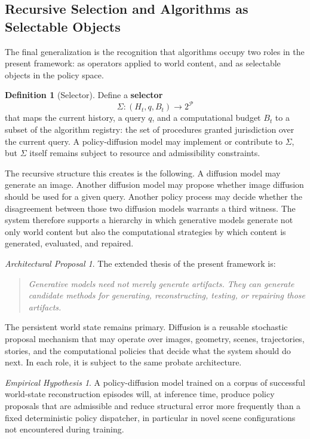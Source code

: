 \documentclass[12pt,a4paper]{article}
\theoremstyle{plain}
\theoremstyle{definition}
\newtheorem{definition}[theorem]{Definition}
\theoremstyle{remark}
\newtheorem{hypothesis}[theorem]{Empirical Hypothesis}
\newtheorem{proposal}[theorem]{Architectural Proposal}
\begin{document}
\subsection{Recursive Selection and Algorithms as Selectable Objects}

The final generalization is the recognition that algorithms occupy two roles in the present framework: as operators applied to world content, and as selectable objects in the policy space.

\begin{definition}[Selector]
Define a \textbf{selector}
\[
\Sigma : (H_t, q, B_t) \to 2^{\mathcal{P}}
\]
that maps the current history, a query $q$, and a computational budget $B_t$ to a subset of the algorithm registry: the set of procedures granted jurisdiction over the current query. A policy-diffusion model may implement or contribute to $\Sigma$, but $\Sigma$ itself remains subject to resource and admissibility constraints.
\end{definition}

The recursive structure this creates is the following. A diffusion model may generate an image. Another diffusion model may propose whether image diffusion should be used for a given query. Another policy process may decide whether the disagreement between those two diffusion models warrants a third witness. The system therefore supports a hierarchy in which generative models generate not only world content but also the computational strategies by which content is generated, evaluated, and repaired.

\begin{proposal}
\label{prop:recursive}
The extended thesis of the present framework is:
\begin{quote}
\itshape
Generative models need not merely generate artifacts. They can generate candidate methods for generating, reconstructing, testing, or repairing those artifacts.
\end{quote}
The persistent world state remains primary. Diffusion is a reusable stochastic proposal mechanism that may operate over images, geometry, scenes, trajectories, stories, and the computational policies that decide what the system should do next. In each role, it is subject to the same probate architecture.
\end{proposal}

\begin{hypothesis}
\label{hyp:policy-diffusion}
A policy-diffusion model trained on a corpus of successful world-state reconstruction episodes will, at inference time, produce policy proposals that are admissible and reduce structural error more frequently than a fixed deterministic policy dispatcher, in particular in novel scene configurations not encountered during training.
\end{hypothesis}
\end{document}
